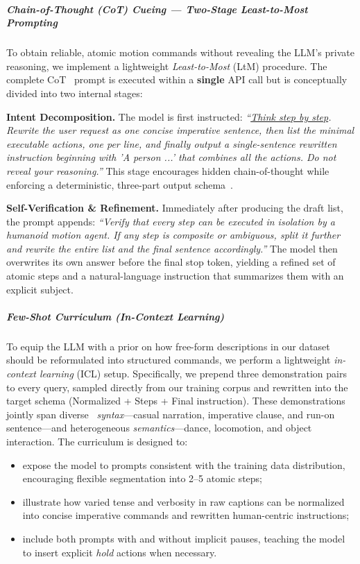 \documentclass[a4paper,12pt]{article}
\begin{document}
\subparagraph{Chain-of-Thought (CoT) Cueing — Two-Stage Least-to-Most Prompting}
To obtain reliable, atomic motion commands without revealing the LLM’s private reasoning,
we implement a lightweight \emph{Least-to-Most} (LtM) procedure.
The complete CoT~\cite{NEURIPS2022_9d560961} prompt is executed within a \textbf{single} API call
but is conceptually divided into two internal stages:


     \textbf{Intent Decomposition.}  
          The model is first instructed:  
          \emph{``\underline{Think step by step}. Rewrite the user request as one concise
          imperative sentence, then list the minimal executable actions, one
          per line, and finally output a single-sentence rewritten instruction beginning with
          'A person ...' that combines all the actions. Do not reveal your reasoning.''}  
          This stage encourages hidden chain-of-thought while enforcing a deterministic,
          three-part output schema~\cite{kojima2022large}.

     \textbf{Self-Verification \& Refinement.}  
          Immediately after producing the draft list, the prompt appends:  
          \emph{``Verify that every step can be executed in isolation by a humanoid
          motion agent. If any step is composite or ambiguous, split it further
          and rewrite the entire list and the final sentence accordingly.''}  
          The model then overwrites its own answer before the final stop token,
          yielding a refined set of atomic steps and a natural-language instruction that
          summarizes them with an explicit subject.



\subparagraph{Few-Shot Curriculum (In-Context Learning)}
To equip the LLM with a prior on how free-form descriptions in our dataset
should be reformulated into structured commands, we perform a lightweight
\emph{in-context learning} (ICL) setup. Specifically, we prepend
three demonstration pairs to every query, sampled directly from our
training corpus and rewritten into the target schema (Normalized + Steps + Final instruction).
These demonstrations jointly span diverse~\cite{wang2022self}
\emph{syntax}—casual narration, imperative clause, and run-on sentence—and
heterogeneous \emph{semantics}—dance, locomotion, and object interaction.
The curriculum is designed to:

\begin{itemize}
    \item expose the model to prompts consistent with the training data distribution, encouraging
          flexible segmentation into 2--5 atomic steps;
    \item illustrate how varied tense and verbosity in raw captions can be
          normalized into concise imperative commands and rewritten human-centric instructions;
    \item include both prompts with and without implicit pauses, teaching the
          model to insert explicit \emph{hold} actions when necessary.
\end{itemize}
\end{document}
